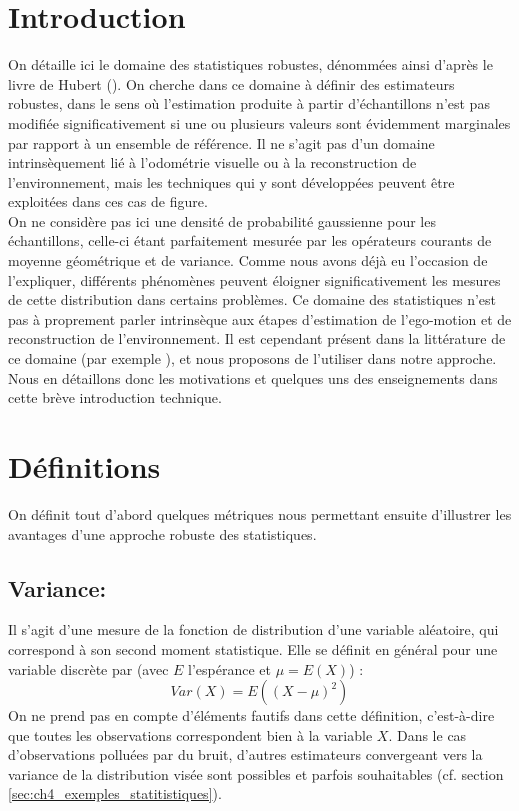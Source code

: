 \section{Introduction} \label{sec:ch4_estimateurs_robustes}
On détaille ici le domaine des \og statistiques robustes\fg{}, dénommées ainsi d'après le livre de Hubert (\cite{Huber1981}). On cherche dans ce domaine à définir des estimateurs robustes, dans le sens où l'estimation produite à partir d'échantillons n'est pas modifiée significativement si une ou plusieurs valeurs sont évidemment marginales par rapport à un ensemble de référence. Il ne s'agit pas d'un domaine intrinsèquement lié à l'odométrie visuelle ou à la reconstruction de l'environnement, mais les techniques qui y sont développées peuvent être exploitées dans ces cas de figure.\\

On ne considère pas ici une densité de probabilité gaussienne pour les échantillons, celle-ci étant parfaitement mesurée par les opérateurs courants de moyenne géométrique et de variance. Comme nous avons déjà eu l'occasion de l'expliquer, différents phénomènes peuvent éloigner significativement les mesures de cette distribution dans certains problèmes. Ce domaine des statistiques n'est pas à proprement parler intrinsèque aux étapes d'estimation de l'ego-motion et de reconstruction de l'environnement. Il est cependant présent dans la littérature de ce domaine (par exemple \cite{Zou}), et nous proposons de l'utiliser dans notre approche. Nous en détaillons donc les motivations et quelques uns des enseignements dans cette brève introduction technique.

\section{Définitions}
On définit tout d'abord quelques métriques nous permettant ensuite d'illustrer les avantages d'une approche robuste des statistiques.

\subsection{Variance:}
Il s'agit d'une mesure de la fonction de distribution d'une variable aléatoire, qui correspond à son second moment statistique. Elle se définit en général pour une variable discrète par (avec $E$ l'espérance et $\mu = E(X)$) :
\begin{equation}
Var(X) = E((X-\mu)^2)
\end{equation}
On ne prend pas en compte d'éléments fautifs dans cette définition, c'est-à-dire que toutes les observations correspondent bien à la variable $X$. Dans le cas d'observations polluées par du bruit, d'autres estimateurs convergeant vers la variance de la distribution visée sont possibles et parfois souhaitables (cf. section \ref{sec:ch4_exemples_statitistiques}).

